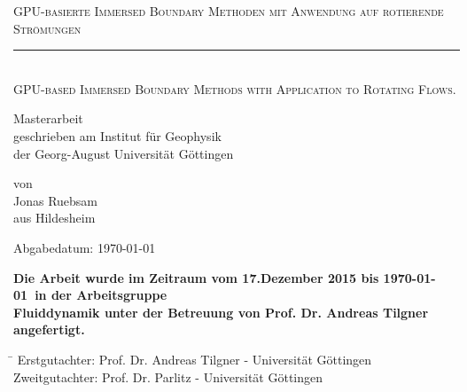 \documentclass[11pt,a4paper,headsepline,bibliography=totoc,idxtotoc,DIV12,openright,twoside=true,chapterprefix=on]{scrbook}
\begin{document}
\makeatletter
\renewcommand*\env@cases[1][1.2]{%
  \let\@ifnextchar\new@ifnextchar
  \left\lbrace
  \def\arraystretch{#1}%
  \array{@{}l@{\quad}l@{}}%
}
\makeatother

\begin{titlepage}
       \begin{center}
       \begin{huge}
       \textsc{GPU-basierte Immersed Boundary Methoden mit Anwendung auf rotierende Strömungen}
       \rule{0.9\textwidth}{0.4pt}\\
       \textsc{GPU-based Immersed Boundary Methods with Application to Rotating Flows.}\\[1.8cm]
       \end{huge}
       \begin{large}
	Masterarbeit\\[2cm]
	geschrieben am Institut für Geophysik\\
	der Georg-August Universität Göttingen\\[2cm]
       \end{large}
       \begin{large}
       von\\[.5cm]
       Jonas Ruebsam\\
       aus Hildesheim\\
       \vfill
       \begin{center}
        \begin{otherlanguage}{ngerman}
       Abgabedatum: \today
        \end{otherlanguage}
       \end{center}
       \end{large}
     \end{center}
\end{titlepage}

\mbox{}
\thispagestyle{empty}
\newpage
\newpage
{}
\thispagestyle{empty}
\vfill
\begin{otherlanguage}{ngerman}
\noindent \textbf{Die Arbeit wurde im Zeitraum vom 17.Dezember 2015 bis \today \ in der Arbeitsgruppe\\ Fluiddynamik
 unter der Betreuung von Prof. Dr. Andreas Tilgner angefertigt. }\\
\end{otherlanguage}

\vfill
\begin{tabbing}
  \hspace{3cm}\=\kill
   Erstgutachter: \quad  Prof. Dr. Andreas Tilgner - Universität Göttingen\\
   Zweitgutachter: \quad  Prof. Dr. Parlitz - Universität Göttingen\\
\end{tabbing}
\end{document}
